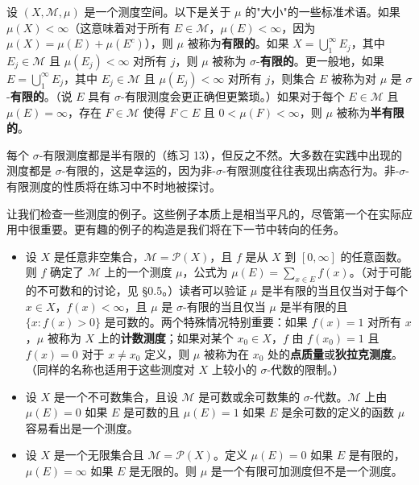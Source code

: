 \documentclass[lang=cn,10pt,thmcnt=section]{elegantbook}
\begin{document}
设 $(X, \mathcal{M}, \mu)$ 是一个测度空间。以下是关于 $\mu$ 的"大小"的一些标准术语。如果 $\mu(X) < \infty$（这意味着对于所有 $E \in \mathcal{M}$，$\mu(E) < \infty$，因为 $\mu(X) = \mu(E) + \mu(E^c)$），则 $\mu$ 被称为\textbf{有限的}。如果 $X = \bigcup_{1}^{\infty} E_j$，其中 $E_j \in \mathcal{M}$ 且 $\mu(E_j) < \infty$ 对所有 $j$，则 $\mu$ 被称为 $\sigma$-\textbf{有限的}。更一般地，如果 $E = \bigcup_{1}^{\infty} E_j$，其中 $E_j \in \mathcal{M}$ 且 $\mu(E_j) < \infty$ 对所有 $j$，则集合 $E$ 被称为对 $\mu$ 是 $\sigma$-\textbf{有限的}。（说 $E$ 具有 $\sigma$-有限测度会更正确但更繁琐。）如果对于每个 $E \in \mathcal{M}$ 且 $\mu(E) = \infty$，存在 $F \in \mathcal{M}$ 使得 $F \subset E$ 且 $0 < \mu(F) < \infty$，则 $\mu$ 被称为\textbf{半有限的}。

每个 $\sigma$-有限测度都是半有限的（练习 13），但反之不然。大多数在实践中出现的测度都是 $\sigma$-有限的，这是幸运的，因为非-$\sigma$-有限测度往往表现出病态行为。非-$\sigma$-有限测度的性质将在练习中不时地被探讨。

让我们检查一些测度的例子。这些例子本质上是相当平凡的，尽管第一个在实际应用中很重要。更有趣的例子的构造是我们将在下一节中转向的任务。

\begin{itemize}
\item 设 $X$ 是任意非空集合，$\mathcal{M} = \mathcal{P}(X)$，且 $f$ 是从 $X$ 到 $[0, \infty]$ 的任意函数。则 $f$ 确定了 $\mathcal{M}$ 上的一个测度 $\mu$，公式为 $\mu(E) = \sum_{x \in E} f(x)$。（对于可能的不可数和的讨论，见 §0.5。）读者可以验证 $\mu$ 是半有限的当且仅当对于每个 $x \in X$，$f(x) < \infty$，且 $\mu$ 是 $\sigma$-有限的当且仅当 $\mu$ 是半有限的且 $\{x : f(x) > 0\}$ 是可数的。两个特殊情况特别重要：如果 $f(x) = 1$ 对所有 $x$，$\mu$ 被称为 $X$ 上的\textbf{计数测度}；如果对某个 $x_0 \in X$，$f$ 由 $f(x_0) = 1$ 且 $f(x) = 0$ 对于 $x \neq x_0$ 定义，则 $\mu$ 被称为在 $x_0$ 处的\textbf{点质量}或\textbf{狄拉克测度}。（同样的名称也适用于这些测度对 $X$ 上较小的 $\sigma$-代数的限制。）

\item 设 $X$ 是一个不可数集合，且设 $\mathcal{M}$ 是可数或余可数集的 $\sigma$-代数。$\mathcal{M}$ 上由 $\mu(E) = 0$ 如果 $E$ 是可数的且 $\mu(E) = 1$ 如果 $E$ 是余可数的定义的函数 $\mu$ 容易看出是一个测度。

\item 设 $X$ 是一个无限集合且 $\mathcal{M} = \mathcal{P}(X)$。定义 $\mu(E) = 0$ 如果 $E$ 是有限的，$\mu(E) = \infty$ 如果 $E$ 是无限的。则 $\mu$ 是一个有限可加测度但不是一个测度。
\end{itemize}
\end{document}
